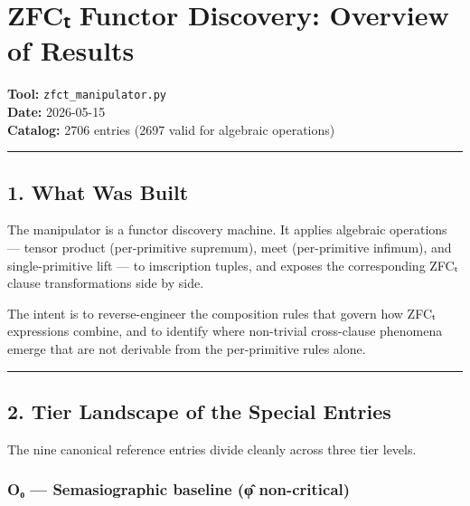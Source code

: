 \section{ZFCₜ Functor Discovery: Overview of
Results}\label{zfcux209c-functor-discovery-overview-of-results}

\textbf{Tool:} \texttt{zfct\_manipulator.py}\\
\textbf{Date:} 2026-05-15\\
\textbf{Catalog:} 2706 entries (2697 valid for algebraic operations)

\begin{center}\rule{0.5\linewidth}{0.5pt}\end{center}

\subsection{1. What Was Built}\label{what-was-built}

The manipulator is a functor discovery machine. It applies algebraic
operations --- tensor product (per-primitive supremum), meet
(per-primitive infimum), and single-primitive lift --- to imscription
tuples, and exposes the corresponding ZFCₜ clause transformations side
by side.

The intent is to reverse-engineer the composition rules that govern how
ZFCₜ expressions combine, and to identify where non-trivial cross-clause
phenomena emerge that are not derivable from the per-primitive rules
alone.

\begin{center}\rule{0.5\linewidth}{0.5pt}\end{center}

\subsection{2. Tier Landscape of the Special
Entries}\label{tier-landscape-of-the-special-entries}

The nine canonical reference entries divide cleanly across three tier
levels.

\subsubsection{O₀ --- Semasiographic baseline (φ̂
non-critical)}\label{oux2080-semasiographic-baseline-ux3c6-non-critical}

